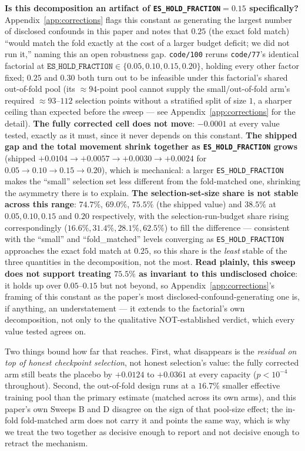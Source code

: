 \documentclass[10pt]{article} %
\begin{document}
\textbf{Is this decomposition an artifact of \texttt{ES\_HOLD\_FRACTION}$=0.15$
specifically?} Appendix~\ref{app:corrections} flags this constant as
generating the largest number of disclosed confounds in this paper and notes
that $0.25$ (the exact fold match) ``would match the fold exactly at the cost
of a larger budget deficit; we did not run it,'' naming this an open
robustness gap. \texttt{code/100} reruns \texttt{code/77}'s identical
factorial at $\texttt{ES\_HOLD\_FRACTION}\in\{0.05,0.10,0.15,0.20\}$, holding
every other factor fixed; $0.25$ and $0.30$ both turn out to be infeasible
under this factorial's shared out-of-fold pool (its $\approx94$-point pool
cannot supply the small/out-of-fold arm's required $\approx93$--$112$
selection points without a stratified split of size $1$, a sharper ceiling
than expected before the sweep --- see Appendix~\ref{app:corrections} for the
detail). \textbf{The fully corrected cell does not move}: $-0.0001$ at every
value tested, exactly as it must, since it never depends on this constant.
\textbf{The shipped gap and the total movement shrink together as
\texttt{ES\_HOLD\_FRACTION} grows} (shipped $+0.0104\to+0.0057\to+0.0030\to+0.0024$
for $0.05\to0.10\to0.15\to0.20$), which is mechanical: a larger
\texttt{ES\_HOLD\_FRACTION} makes the ``small'' selection set less different
from the fold-matched one, shrinking the asymmetry there is to explain.
\textbf{The selection-set-size share is not stable across this range}: $74.7\%$,
$69.0\%$, $75.5\%$ (the shipped value) and $38.5\%$ at $0.05, 0.10, 0.15$ and
$0.20$ respectively, with the selection-run-budget share rising correspondingly
($16.6\%,31.4\%,28.1\%,62.5\%$) to fill the difference --- consistent with the
``small'' and ``fold\_matched'' levels converging as
\texttt{ES\_HOLD\_FRACTION} approaches the exact fold match at $0.25$, so this
share is the \emph{least} stable of the three quantities in the decomposition,
not the most. \textbf{Read plainly, this sweep does not support treating
$75.5\%$ as invariant to this undisclosed choice}: it holds up over
$0.05$--$0.15$ but not beyond, so Appendix~\ref{app:corrections}'s framing of
this constant as the paper's most disclosed-confound-generating one is, if
anything, an understatement --- it extends to the factorial's own
decomposition, not only to the qualitative NOT-established verdict, which
every value tested agrees on.

Two things bound how far that reaches. First, what disappears is the
\emph{residual on top of honest checkpoint selection}, not honest selection's
value: the fully corrected arm still beats the placebo by $+0.0124$ to
$+0.0361$ at every capacity ($p<10^{-4}$ throughout). Second, the out-of-fold
design runs at a $16.7\%$ smaller effective training pool than the primary
estimate (matched across its own arms), and this paper's own Sweeps B and D
disagree on the sign of that pool-size effect; the in-fold fold-matched arm
does not carry it and points the same way, which is why we treat the two
together as decisive enough to report and not decisive enough to retract the
mechanism.
\end{document}
